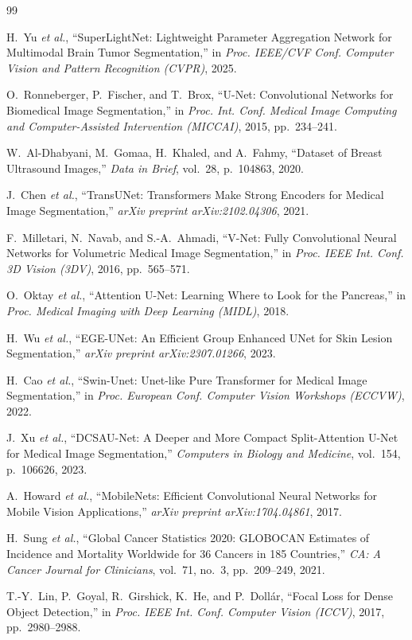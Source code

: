 \documentclass[conference]{IEEEtran}
\begin{document}

\begin{thebibliography}{99}

H.~Yu \textit{et al.},
``SuperLightNet: Lightweight Parameter Aggregation Network for
Multimodal Brain Tumor Segmentation,''
in \textit{Proc. IEEE/CVF Conf. Computer Vision and Pattern
Recognition (CVPR)}, 2025.

O.~Ronneberger, P.~Fischer, and T.~Brox,
``U-Net: Convolutional Networks for Biomedical Image Segmentation,''
in \textit{Proc. Int. Conf. Medical Image Computing and
Computer-Assisted Intervention (MICCAI)}, 2015, pp.~234--241.

W.~Al-Dhabyani, M.~Gomaa, H.~Khaled, and A.~Fahmy,
``Dataset of Breast Ultrasound Images,''
\textit{Data in Brief}, vol.~28, p.~104863, 2020.

J.~Chen \textit{et al.},
``TransUNet: Transformers Make Strong Encoders for Medical Image
Segmentation,''
\textit{arXiv preprint arXiv:2102.04306}, 2021.

F.~Milletari, N.~Navab, and S.-A.~Ahmadi,
``V-Net: Fully Convolutional Neural Networks for Volumetric Medical
Image Segmentation,''
in \textit{Proc. IEEE Int. Conf. 3D Vision (3DV)}, 2016, pp.~565--571.

O.~Oktay \textit{et al.},
``Attention U-Net: Learning Where to Look for the Pancreas,''
in \textit{Proc. Medical Imaging with Deep Learning (MIDL)}, 2018.

H.~Wu \textit{et al.},
``EGE-UNet: An Efficient Group Enhanced UNet for Skin Lesion
Segmentation,''
\textit{arXiv preprint arXiv:2307.01266}, 2023.

H.~Cao \textit{et al.},
``Swin-Unet: Unet-like Pure Transformer for Medical Image
Segmentation,''
in \textit{Proc. European Conf. Computer Vision Workshops (ECCVW)},
2022.

J.~Xu \textit{et al.},
``DCSAU-Net: A Deeper and More Compact Split-Attention U-Net for
Medical Image Segmentation,''
\textit{Computers in Biology and Medicine}, vol.~154, p.~106626, 2023.

A.~Howard \textit{et al.},
``MobileNets: Efficient Convolutional Neural Networks for Mobile
Vision Applications,''
\textit{arXiv preprint arXiv:1704.04861}, 2017.

H.~Sung \textit{et al.},
``Global Cancer Statistics 2020: GLOBOCAN Estimates of Incidence and
Mortality Worldwide for 36 Cancers in 185 Countries,''
\textit{CA: A Cancer Journal for Clinicians}, vol.~71, no.~3,
pp.~209--249, 2021.

T.-Y.~Lin, P.~Goyal, R.~Girshick, K.~He, and P.~Doll{\'a}r,
``Focal Loss for Dense Object Detection,''
in \textit{Proc. IEEE Int. Conf. Computer Vision (ICCV)}, 2017,
pp.~2980--2988.

\end{thebibliography}
\end{document}
